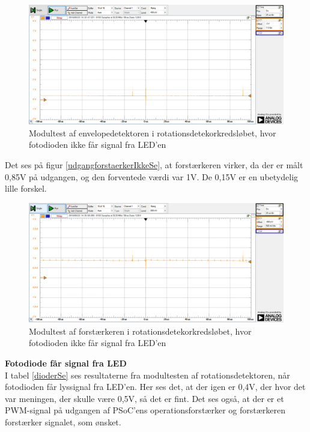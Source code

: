 \begin{figure}[H]
	\centering
	\includegraphics[width=\textwidth]{Test/images/AffyringTest/IkkeSe/envelopedetektor}
	\caption{Modultest af envelopedetektoren i rotationsdetekorkredsløbet, hvor fotodioden ikke får signal fra LED'en}
	\label{fig:envdetIkkeSe}
\end{figure}

Det ses på figur \ref{udgangforstaerkerIkkeSe}, at forstærkeren virker, da der er målt 0,85V på udgangen, og den forventede værdi var 1V. De 0,15V er en ubetydelig lille forskel. 

\begin{figure}[H]
	\centering
	\includegraphics[width=\textwidth]{Test/images/AffyringTest/IkkeSe/udgang_forstaerker}
	\caption{Modultest af forstærkeren i rotationsdetekorkredsløbet, hvor fotodioden ikke får signal fra LED'en}
	\label{fig:udgangforstaerkerIkkeSe}
\end{figure}

\noindent \textbf{Fotodiode får signal fra LED} \\
\noindent I tabel \ref{dioderSe} ses resultaterne fra modultesten af rotationsdetektoren, når fotodioden får lyssignal fra LED'en. Her ses det, at der igen er 0,4V, der hvor det var meningen, der skulle være 0,5V, så det er fint. Det ses også, at der er et PWM-signal på udgangen af PSoC'ens operationsforstærker og forstærkeren forstærker signalet, som ønsket. 

